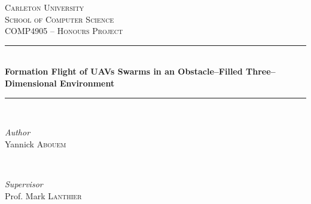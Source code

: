 \begin{titlepage} %
	\newcommand{\HRule}{\rule{\linewidth}{0.5mm}} %
	
	\center %
	
	
	\textsc{\LARGE Carleton University}\\[1.5cm] %
	
	\textsc{\Large School of Computer Science}\\[0.5cm] %
	
	\textsc{\large COMP4905 -- Honours Project}\\[0.5cm] %
	
	
	\HRule\\[0.4cm]
	
	{\huge\bfseries Formation Flight of UAVs Swarms in an Obstacle--Filled Three--Dimensional Environment}\\[0.4cm] %
	
	\HRule\\[1.5cm]
	
	
	\begin{minipage}{0.4\textwidth}
		\begin{flushleft}
			\large
			\textit{Author}\\
			Yannick \textsc{Abouem} %
		\end{flushleft}
	\end{minipage}
	~
	\begin{minipage}{0.4\textwidth}
		\begin{flushright}
			\large
			\textit{Supervisor}\\
			Prof. Mark \textsc{Lanthier} %
		\end{flushright}
	\end{minipage}
	

\end{titlepage}
